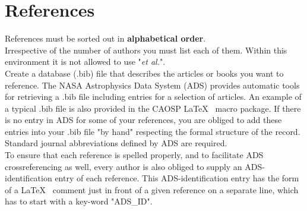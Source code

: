 \documentclass{caosp306}
\begin{document}
\section{References}
References must be sorted out in \textbf{alphabetical order}.
\\
Irrespective of the number of authors you must list each of them. Within
this environment it is not allowed to use "{\it et al.}".
\\
Create a database (.bib) file that describes the articles or books you 
   want to reference. The NASA Astrophysics Data System (ADS) provides
   automatic tools for retrieving a .bib file including entries for a
   selection of articles.  An example of a typical .bib file is also 
   provided in the CAOSP \LaTeX~ macro package.
   If there is no entry in ADS for some of your references, you are
   obliged to add these entries into your .bib file "by hand" respecting
   the formal structure of the record. Standard journal abbreviations
   defined by ADS are required.
   \\
   To ensure that each reference is spelled properly, and to facilitate ADS
crossreferencing as well, every author is also obliged to supply an
ADS-identification entry of each reference. This ADS-identification entry
has the form of a \LaTeX~ comment just in front of a given reference on a
separate line, which has to start with a key-word "ADS\_ID". 
\end{document}

